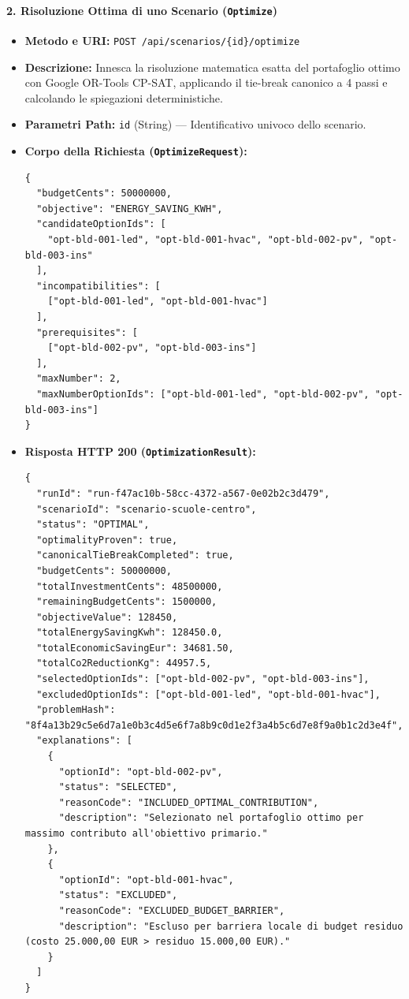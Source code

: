 \paragraph{2. Risoluzione Ottima di uno Scenario (\texttt{Optimize})}
\begin{itemize}[leftmargin=1.4em, itemsep=0.1em]
    \item \textbf{Metodo e URI:} \texttt{POST /api/scenarios/\{id\}/optimize}
    \item \textbf{Descrizione:} Innesca la risoluzione matematica esatta del portafoglio ottimo con Google OR-Tools CP-SAT, applicando il tie-break canonico a 4 passi e calcolando le spiegazioni deterministiche.
    \item \textbf{Parametri Path:} \texttt{id} (String) --- Identificativo univoco dello scenario.
    \item \textbf{Corpo della Richiesta (\texttt{OptimizeRequest}):}
\begin{lstlisting}
{
  "budgetCents": 50000000,
  "objective": "ENERGY_SAVING_KWH",
  "candidateOptionIds": [
    "opt-bld-001-led", "opt-bld-001-hvac", "opt-bld-002-pv", "opt-bld-003-ins"
  ],
  "incompatibilities": [
    ["opt-bld-001-led", "opt-bld-001-hvac"]
  ],
  "prerequisites": [
    ["opt-bld-002-pv", "opt-bld-003-ins"]
  ],
  "maxNumber": 2,
  "maxNumberOptionIds": ["opt-bld-001-led", "opt-bld-002-pv", "opt-bld-003-ins"]
}
\end{lstlisting}
    \item \textbf{Risposta HTTP 200 (\texttt{OptimizationResult}):}
\begin{lstlisting}
{
  "runId": "run-f47ac10b-58cc-4372-a567-0e02b2c3d479",
  "scenarioId": "scenario-scuole-centro",
  "status": "OPTIMAL",
  "optimalityProven": true,
  "canonicalTieBreakCompleted": true,
  "budgetCents": 50000000,
  "totalInvestmentCents": 48500000,
  "remainingBudgetCents": 1500000,
  "objectiveValue": 128450,
  "totalEnergySavingKwh": 128450.0,
  "totalEconomicSavingEur": 34681.50,
  "totalCo2ReductionKg": 44957.5,
  "selectedOptionIds": ["opt-bld-002-pv", "opt-bld-003-ins"],
  "excludedOptionIds": ["opt-bld-001-led", "opt-bld-001-hvac"],
  "problemHash": "8f4a13b29c5e6d7a1e0b3c4d5e6f7a8b9c0d1e2f3a4b5c6d7e8f9a0b1c2d3e4f",
  "explanations": [
    {
      "optionId": "opt-bld-002-pv",
      "status": "SELECTED",
      "reasonCode": "INCLUDED_OPTIMAL_CONTRIBUTION",
      "description": "Selezionato nel portafoglio ottimo per massimo contributo all'obiettivo primario."
    },
    {
      "optionId": "opt-bld-001-hvac",
      "status": "EXCLUDED",
      "reasonCode": "EXCLUDED_BUDGET_BARRIER",
      "description": "Escluso per barriera locale di budget residuo (costo 25.000,00 EUR > residuo 15.000,00 EUR)."
    }
  ]
}
\end{lstlisting}
\end{itemize}

